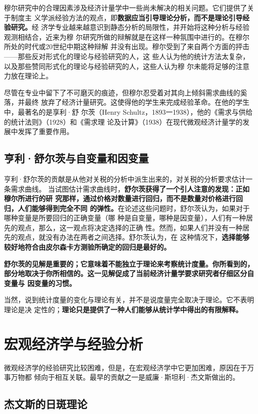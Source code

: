 穆尔研究中的合理因素涉及经济计量学中一些尚未解决的相关问题。它们提供了关于制度主
义学派经验方法的观点，即\textbf{数据应当引导理论分析，而不是理论引导经验研究。}经
济学专业越来越意识到静态分析的局限性，并开始将这种分析与经验观测相结合，近来为穆
尔研究所做的辩解就是在这样一种氛围中进行的。在穆尔所处的时代或20世纪中期这种辩解
并没有出现。穆尔受到了来自两个方面的抨击——那些反对形式化的理论与经验研究的人，这
些人认为他的统计方法太复杂，以及那些赞同形式化的理论与经验研究的人，这些人认为穆
尔未能将足够的注意力放在理论上。

尽管在专业中留下了不可磨灭的痕迹，但穆尔忍受着对其向上倾斜需求曲线的奚落，并最终
放弃了经济计量研究。这使得他的学生来完成经验革命。在他的学生中，最著名的是享利·舒
尔茨（Henry Schultz，1893一1938），他的《需求与供给的统计法则》（1928）和《需求理
论及计算》（1938）在现代微观经济计量学的发展中发挥了重要作用。

\subsection{亨利·舒尔茨与自变量和因变量}

亨利·舒尔茨的贡献是从他对关税的分析中派生出来的，对关税的分析要求估计一条需求曲线。
当试图估计需求曲线时，\textbf{舒尔茨获得了一个引人注意的发现：正如穆尔所进行的研
  究那样，通过价格对数量进行回归，而不是数量对价格进行回归，人们能够得到完全不同
  的弹性。}在论述这些问题时，舒尔茨认为，如果对于哪种变量是所要回归的正确变量（哪
种是自变量，哪种是因变量），人们有一种居先的观点，那么，这一观点将决定选择的正确
性。然而，如果人们并没有一种居先的观点，就没有办法在两者之间选择。舒尔茨认为，在
这种情况下，\textbf{选择能够较好地符合由皮尔森卡方测验所确定的回归是最好的。}

\textbf{舒尔茨的见解是重要的；它意味着不能独立于理论来考察统计度量。你所看到的，
  部分地取决于你所相信的。这一见解促成了当前经济计量学要求研究者仔细区分自变量与
  因变量的习惯。}

当然，说到统计度量的变化与理论有关，并不是说度量完全取决于理论。它不表明理论是决
定性的；\textbf{理论只是提供了一种人们能够从统计学中得出的有限解释。}

\section{宏观经济学与经验分析}

微观经济学的经验研究比较困难，但是，在宏观经济学中它更加困难，原因在于万事万物都
倾向于相互关联。最早的贡献之一是威廉·斯坦利·杰文斯做出的。

\subsection{杰文斯的日斑理论}

